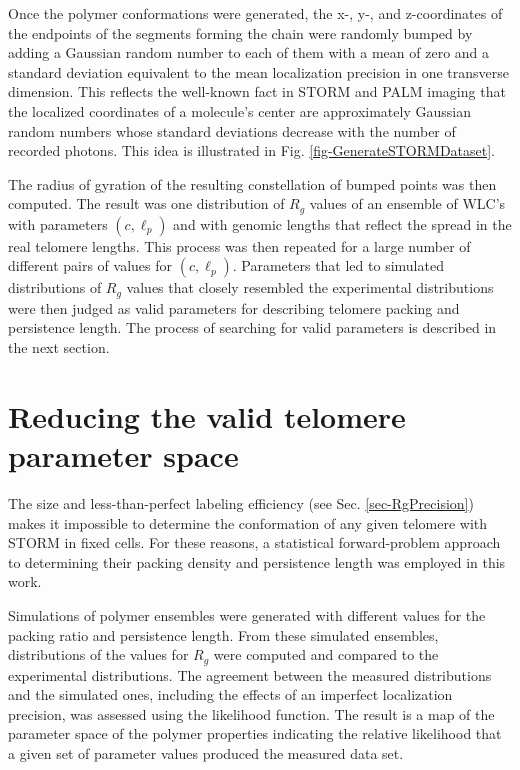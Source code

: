 \documentclass[12pt, a4paper]{article}
\begin{document}
Once the polymer conformations were generated, the x-, y-, and
z-coordinates of the endpoints of the segments forming the chain
were randomly bumped by adding a Gaussian random number to each of
them with a mean of zero and a standard deviation equivalent to the
mean localization precision in one transverse dimension. This
reflects the well-known fact in STORM and PALM imaging that the
localized coordinates of a molecule's center are approximately
Gaussian random numbers whose standard deviations decrease with the
number of recorded photons. This idea is illustrated in
Fig. \ref{fig-GenerateSTORMDataset}.

The radius of gyration of the resulting constellation of bumped
points was then computed. The result was one distribution of $R_g$
values of an ensemble of WLC's with parameters $\left( c, \ell_p
   \right)$ and with genomic lengths that reflect the spread in the
real telomere lengths. This process was then repeated for a large
number of different pairs of values for $\left( c, \ell_p
   \right)$. Parameters that led to simulated distributions of $R_g$
values that closely resembled the experimental distributions were
then judged as valid parameters for describing telomere packing and
persistence length. The process of searching for valid parameters
is described in the next section.

\section{Reducing the valid telomere parameter space}
\label{sec-3}
\label{sec-MLE}
The size and less-than-perfect labeling efficiency (see
Sec. \ref{sec-RgPrecision}) makes it impossible to determine the
conformation of any given telomere with STORM in fixed cells. For
these reasons, a statistical forward-problem approach to
determining their packing density and persistence length was
employed in this work.

Simulations of polymer ensembles were generated with different
values for the packing ratio and persistence length. From these
simulated ensembles, distributions of the values for $R_g$ were
computed and compared to the experimental distributions. The
agreement between the measured distributions and the simulated ones,
including the effects of an imperfect localization precision, was
assessed using the likelihood function. The result is a map of the
parameter space of the polymer properties indicating the relative
likelihood that a given set of parameter values produced the
measured data set.
\end{document}
